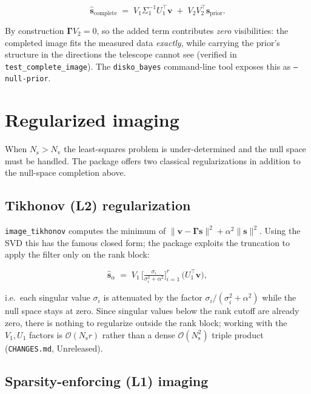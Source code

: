 \documentclass[11pt,a4paper]{article}
\newcommand{\Ns}{N_{\mathrm{s}}}
\newcommand{\Nv}{N_{\mathrm{v}}}
\newcommand{\Gammam}{\boldsymbol{\Gamma}}
\newcommand{\svec}{\boldsymbol{s}}
\newcommand{\vvec}{\boldsymbol{v}}
\begin{document}
\begin{equation}
  \label{eq:complete}
  \hat{\svec}_{\mathrm{complete}}
  \;=\; V_1\Sigma_1^{-1}U_1^{\!\top}\vvec
     \;+\; V_2V_2^{\!\top}\svec_{\mathrm{prior}}.
\end{equation}

By construction $\Gammam V_2=0$, so the added term contributes \emph{zero}
visibilities: the completed image fits the measured data \emph{exactly}, while
carrying the prior's structure in the directions the telescope cannot see
(verified in \texttt{test\_complete\_image}). The \texttt{disko\_bayes}
command-line tool exposes this as \texttt{--null-prior}.

\section{Regularized imaging}
\label{sec:reg}

When $\Ns>\Nv$ the least-squares problem is under-determined and the null
space must be handled. The package offers two classical regularizations in
addition to the null-space completion above.

\subsection{Tikhonov (L2) regularization}

\texttt{image\_tikhonov} computes the minimum of
$\|\vvec-\Gammam\svec\|^2+\alpha^2\|\svec\|^2$. Using the SVD this has the
famous closed form; the package exploits the truncation to apply the filter
only on the rank block:

\begin{equation}
  \label{eq:tikhonov}
  \hat{\svec}_\alpha
  \;=\; V_1\,
    \Big[ \tfrac{\sigma_i}{\sigma_i^2+\alpha^2}\Big]_{i=1}^{r}\,
    \big(U_1^{\!\top}\vvec\big),
\end{equation}

i.e.\ each singular value $\sigma_i$ is attenuated by the factor
$\sigma_i/(\sigma_i^2+\alpha^2)$ while the null space stays at zero. Since
singular values below the rank cutoff are already zero, there is nothing to
regularize outside the rank block; working with the $V_1,U_1$ factors is
$\mathcal{O}(\Ns r)$ rather than a dense
$\mathcal{O}(\Ns^2)$ triple product
(\texttt{CHANGES.md}, Unreleased).

\subsection{Sparsity-enforcing (L1) imaging}
\end{document}
